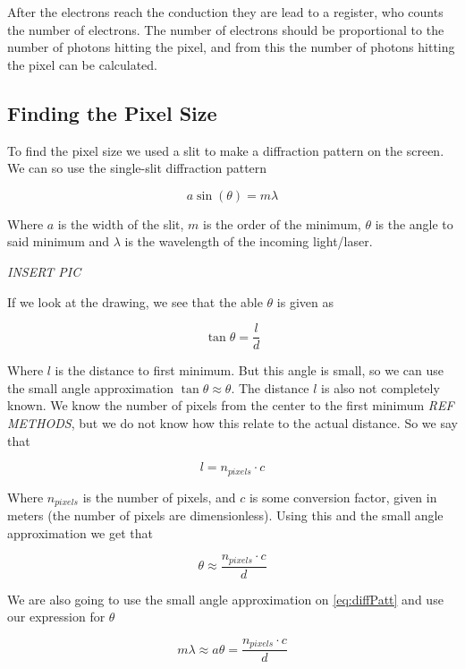 \documentclass{emulateapj}
\begin{document}
After the electrons reach the conduction they are lead to a register, who counts the number of electrons. The number of electrons should be proportional to the number of photons hitting the pixel, and from this the number of photons hitting the pixel can be calculated.


\subsection{Finding the Pixel Size}
To find the pixel size we used a slit to make a diffraction pattern on the screen. We can so use the single-slit diffraction pattern

\begin{equation}
a \sin(\theta) = m\lambda
\label{eq:diffPatt}
\end{equation}

Where $a$ is the width of the slit, $m$ is the order of the minimum, $\theta$ is the angle to said minimum and $\lambda$ is the wavelength of the incoming light/laser.

\emph{INSERT PIC}

If we look at the drawing, we see that the able $\theta$ is given as

\begin{equation}
\tan \theta = \frac{l}{d}
\end{equation}

Where $l$ is the distance to first minimum. But this angle is small, so we can use the small angle approximation $\tan \theta \approx \theta$. The distance $l$ is also not completely known. We know the number of pixels from the center to the first minimum \emph{REF METHODS}, but we do not know how this relate to the actual distance. So we say that

\begin{equation}
l = n_{pixels}\cdot c
\end{equation}

Where $n_{pixels}$ is the number of pixels, and $c$ is some conversion factor, given in meters (the number of pixels are dimensionless). Using this and the small angle approximation we get that

\begin{equation}
\theta \approx \frac{n_{pixels}\cdot c}{d}
\end{equation}

We are also going to use the small angle approximation on \eqref{eq:diffPatt} and use our expression for $\theta$

\begin{equation}
m\lambda \approx a\theta = \frac{n_{pixels}\cdot c}{d}
\end{equation}
\end{document}

